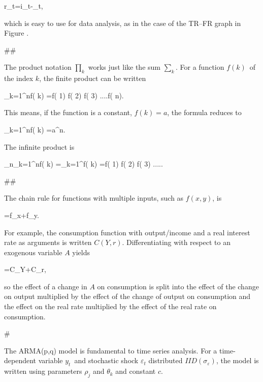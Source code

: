 ﻿\documentclass[oneside]{book}
\begin{document}
r_{t}=i_{t}-\pi _{t},


which is easy to use for data analysis, as in the case of the TR--FR graph in Figure .



##

The product notation $\prod_{k}$ works just like the sum $\sum_{k}$. For a function $f( k) $\ of the index $k$, the finite product
can be written



\prod_{k=1}^{n}f( k) =f( 1) \cdot f(
2) \cdot f( 3) \cdot ....\cdot f( n).


This means, if the function is a constant, $f( k) =a$, the formula
reduces to



\prod_{k=1}^{n}f( k) =a^{n}.


The infinite product is



\lim_{n\rightarrow \infty }\prod_{k=1}^{n}f( k)
=\prod_{k=1}^{\infty }f( k) =f( 1) \cdot
f( 2) \cdot f( 3) \cdot .....






##

The chain rule for functions with multiple inputs, such as $f( x,y)$, is



=f_{x}+f_{y}.




For example, the consumption function with output/income and a real interest
rate as arguments is written $C( Y,r).$ Differentiating with
respect to an exogenous variable $A$ yields



=C_{Y}+C_{r},


so the effect of a change in $A$ on consumption is split into the effect of
the change on output multiplied by the effect of the change of output on consumption
and the effect on the real rate multiplied by the effect of the real rate on
consumption.



#



The ARMA(p,q) model is fundamental to time series analysis. For a time-dependent variable $y_{t}$\ and stochastic shock $\varepsilon _{t}$ distributed $IID( \sigma _{\varepsilon }) $, the model is written using parameters $\rho _{j}$ and $\theta _{k}$ and constant $c$.
\end{document}
